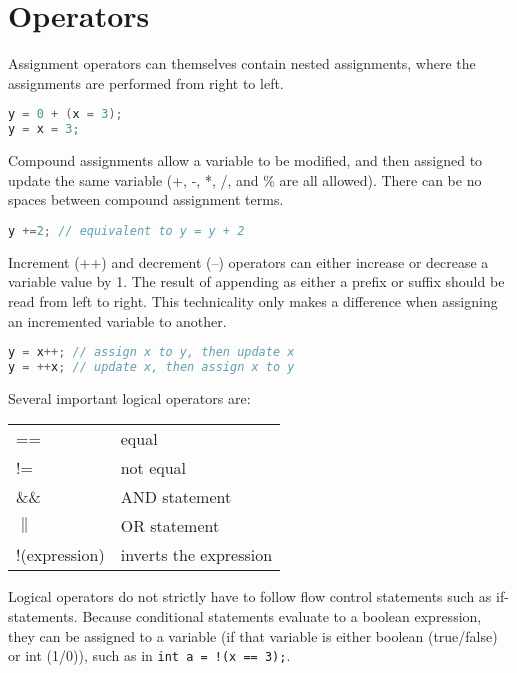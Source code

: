 \documentclass[10pt]{article}
\begin{document}
\section{Operators}

Assignment operators can themselves contain nested assignments, where the assignments are performed from right to left.

\begin{lstlisting}[language=C++]
y = 0 + (x = 3);
y = x = 3;
\end{lstlisting}

Compound assignments allow a variable to be modified, and then assigned to update the same variable (+, -, *, /, and \% are all allowed). There can be no spaces between compound assignment terms.

\begin{lstlisting}[language=C++]
y +=2; // equivalent to y = y + 2
\end{lstlisting}

Increment (++) and decrement (--) operators can either increase or decrease a variable value by 1. The result of appending as either a prefix or suffix should be read from left to right. This technicality only makes a difference when assigning an incremented variable to another.

\begin{lstlisting}[language=C++]
y = x++; // assign x to y, then update x
y = ++x; // update x, then assign x to y
\end{lstlisting}

Several important logical operators are:

\begin{center}
\begin{tabular}{l l}
== & equal\\
!= & not equal\\
\&\& & AND statement\\
\(\|\) & OR statement\\
!(expression) & inverts the expression\\
\end{tabular}
\end{center}

Logical operators do not strictly have to follow flow control statements such as if-statements. Because conditional statements evaluate to a boolean expression, they can be assigned to a variable (if that variable is either boolean (true/false) or int (1/0)), such as in \texttt{int a = !(x == 3);}.
\end{document}
